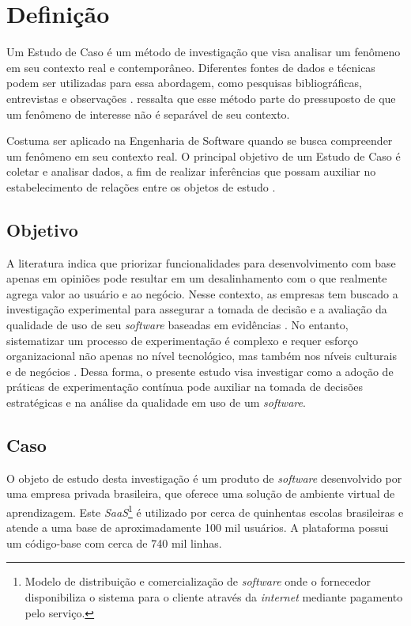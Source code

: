 \section{Definição}

Um Estudo de Caso é um método de investigação que visa analisar um fenômeno em seu contexto real e contemporâneo. Diferentes fontes de dados e técnicas podem ser utilizadas para essa abordagem, como pesquisas bibliográficas, entrevistas e observações \cite{wohlin_experimentation_2012}.  ressalta que esse método parte do pressuposto de que um fenômeno de interesse não é separável de seu contexto.

Costuma ser aplicado na Engenharia de Software quando se busca compreender um fenômeno em seu contexto real. O principal objetivo de um Estudo de Caso é coletar e analisar dados, a fim de realizar inferências que possam auxiliar no estabelecimento de relações entre os objetos de estudo \cite{wohlin_experimentation_2012}.


\subsection{Objetivo}

A literatura indica que priorizar funcionalidades para desenvolvimento com base apenas em opiniões pode resultar em um desalinhamento com o que realmente agrega valor ao usuário e ao negócio. Nesse contexto, as empresas tem buscado a investigação experimental para assegurar a tomada de decisão e a avaliação da qualidade de uso de seu \textit{software} baseadas em evidências \cite{olsson_opinions_2014}. No entanto, sistematizar um processo de experimentação é complexo e requer esforço organizacional não apenas no nível tecnológico, mas também nos níveis culturais e de negócios \cite{fabijan_evolution_2017}. Dessa forma, o presente estudo visa investigar como a adoção de práticas de experimentação contínua pode auxiliar na tomada de decisões estratégicas e na análise da qualidade em uso de um \textit{software}.


\subsection{Caso}

O objeto de estudo desta investigação é um produto de \textit{software} desenvolvido por uma empresa privada brasileira, que oferece uma solução de ambiente virtual de aprendizagem. Este \textit{SaaS}\footnote{Modelo de distribuição e comercialização de \textit{software} onde o fornecedor disponibiliza o sistema para o cliente através da \textit{internet} mediante pagamento pelo serviço.} é utilizado por cerca de quinhentas escolas brasileiras e atende a uma base de aproximadamente 100 mil usuários. A plataforma possui um código-base com cerca de 740 mil linhas.

